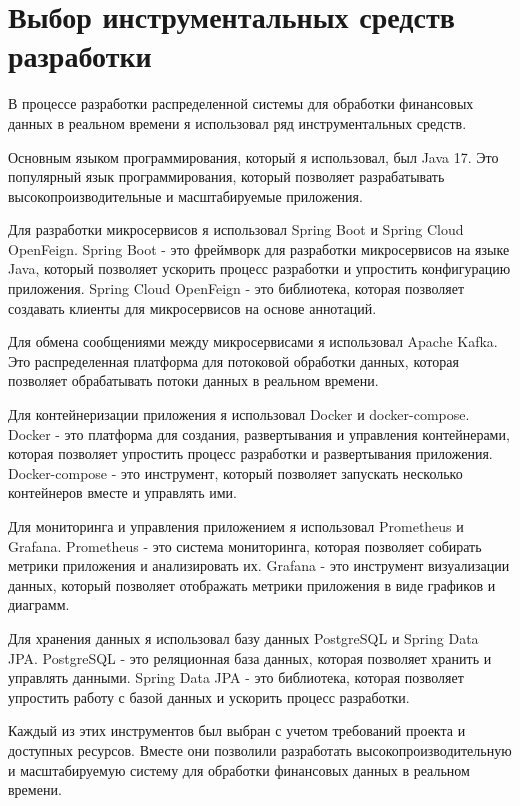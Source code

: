 \section{Выбор инструментальных средств разработки}

В процессе разработки распределенной системы для обработки финансовых данных в реальном времени я использовал ряд инструментальных средств.

Основным языком программирования, который я использовал, был Java 17. Это популярный язык программирования, который позволяет разрабатывать высокопроизводительные и масштабируемые приложения.

Для разработки микросервисов я использовал Spring Boot и Spring Cloud OpenFeign. Spring Boot - это фреймворк для разработки микросервисов на языке Java, который позволяет ускорить процесс разработки и упростить конфигурацию приложения. Spring Cloud OpenFeign - это библиотека, которая позволяет создавать клиенты для микросервисов на основе аннотаций.

Для обмена сообщениями между микросервисами я использовал Apache Kafka. Это распределенная платформа для потоковой обработки данных, которая позволяет обрабатывать потоки данных в реальном времени.

Для контейнеризации приложения я использовал Docker и docker-compose. Docker - это платформа для создания, развертывания и управления контейнерами, которая позволяет упростить процесс разработки и развертывания приложения. Docker-compose - это инструмент, который позволяет запускать несколько контейнеров вместе и управлять ими.

Для мониторинга и управления приложением я использовал Prometheus и Grafana. Prometheus - это система мониторинга, которая позволяет собирать метрики приложения и анализировать их. Grafana - это инструмент визуализации данных, который позволяет отображать метрики приложения в виде графиков и диаграмм.

Для хранения данных я использовал базу данных PostgreSQL и Spring Data JPA. PostgreSQL - это реляционная база данных, которая позволяет хранить и управлять данными. Spring Data JPA - это библиотека, которая позволяет упростить работу с базой данных и ускорить процесс разработки.

Каждый из этих инструментов был выбран с учетом требований проекта и доступных ресурсов. Вместе они позволили разработать высокопроизводительную и масштабируемую систему для обработки финансовых данных в реальном времени.